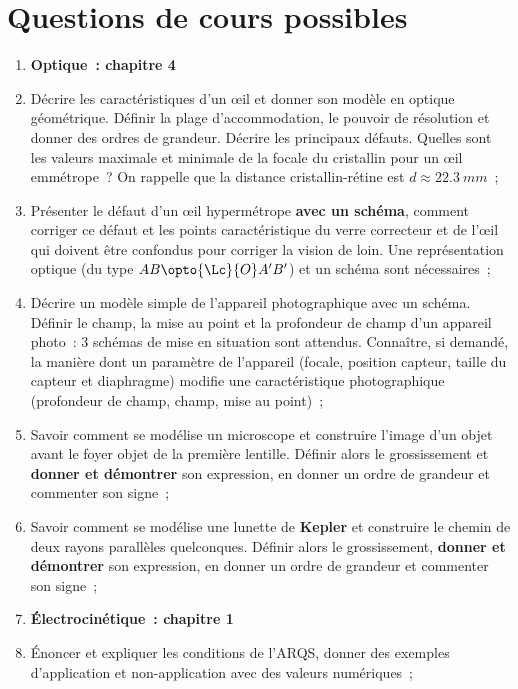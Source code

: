 \documentclass[a4paper, 12pt, final, garamond]{book}
\begin{document}
\section{Questions de cours possibles}
\begin{enumerate}
	\item[] \textbf{Optique~: chapitre 4}
	\item Décrire les caractéristiques d'un œil et donner son modèle en optique
	      géométrique. Définir la plage d'accommodation, le pouvoir de résolution
	      et donner des ordres de grandeur. Décrire les principaux défauts.
	      Quelles sont les valeurs maximale et minimale de la focale du
	      cristallin pour un œil emmétrope~? On rappelle que la distance
	      cristallin-rétine est $d \approx \SI{22.3}{mm}$~;
	\item Présenter le défaut d'un œil hypermétrope \textbf{avec un schéma},
	      comment corriger ce défaut et les points caractéristique du verre
	      correcteur et de l'œil qui doivent être confondus pour corriger la
	      vision de loin. Une représentation optique (du type $AB \opto{\Lc}{O}
		      A'B'$) et un schéma sont nécessaires~;
	\item Décrire un modèle simple de l'appareil photographique avec un schéma.
	      Définir le champ, la mise au point et la profondeur de champ d'un
	      appareil photo~: 3 schémas de mise en situation sont attendus.
	      Connaître, si demandé, la manière dont un paramètre de l'appareil
	      (focale, position capteur, taille du capteur et diaphragme) modifie une
	      caractéristique photographique (profondeur de champ, champ, mise au
	      point)~;
	\item Savoir comment se modélise un microscope et construire l'image d'un
	      objet avant le foyer objet de la première lentille. Définir alors le
	      grossissement et \textbf{donner et démontrer} son expression, en donner
	      un ordre de grandeur et commenter son signe~;
	\item Savoir comment se modélise une lunette de \textbf{Kepler} et
	      construire le chemin de deux rayons parallèles quelconques. Définir
	      alors le grossissement, \textbf{donner et démontrer} son expression, en
	      donner un ordre de grandeur et commenter son signe~;
	\item[] \textbf{Électrocinétique~: chapitre 1}
	\item Énoncer et expliquer les conditions de l'ARQS, donner des exemples
	      d'application et non-application avec des valeurs numériques~;

\end{enumerate}
\end{document}
